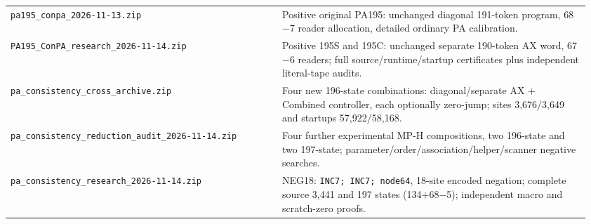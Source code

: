 \begin{longtable}{@{}>{\raggedright\arraybackslash}p{0.45\linewidth}>{\raggedright\arraybackslash}p{0.51\linewidth}@{}}
\nolinkurl{pa195_conpa_2026-11-13.zip} & Positive original PA195: unchanged diagonal 191-token program, 68$-$7 reader allocation, detailed ordinary PA calibration.\\[3pt]
\nolinkurl{PA195_ConPA_research_2026-11-14.zip} & Positive 195S and 195C: unchanged separate 190-token AX word, 67$-$6 readers; full source/runtime/startup certificates plus independent literal-tape audits.\\[3pt]
\nolinkurl{pa_consistency_cross_archive.zip} & Four new 196-state combinations: diagonal/separate AX + Combined controller, each optionally zero-jump; sites 3,676/3,649 and startups 57,922/58,168.\\[3pt]
\nolinkurl{pa_consistency_reduction_audit_2026-11-14.zip} & Four further experimental MP-H compositions, two 196-state and two 197-state; parameter/order/association/helper/scanner negative searches.\\[3pt]
\nolinkurl{pa_consistency_research_2026-11-14.zip} & NEG18: \texttt{INC7; INC7; node64}, 18-site encoded negation; complete source 3,441 and 197 states (134+68$-$5); independent macro and scratch-zero proofs.\\[3pt]
\end{longtable}
\endgroup
